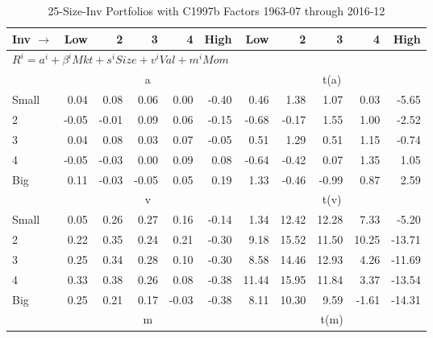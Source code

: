 
\begin{table}[!ht]
\centering
\caption{25-Size-Inv Portfolios with C1997b Factors 1963-07 through 2016-12}
\begin{tabular}{lrrrrrrrrrr}
  \toprule
    Inv $\rightarrow$ & Low & 2 & 3 & 4 & High & Low & 2 & 3 & 4 & High \\ 
  \midrule
  \multicolumn{11}{l}{$R^i=a^i+\beta^iMkt+s^iSize+v^iVal+m^iMom$} \\

  
    
      & \multicolumn{5}{c}{a} & \multicolumn{5}{c}{t(a)}
    
    \\
      \cmidrule(r){2-6} \cmidrule(r){7-11}

    Small   & 0.04  & 0.08  & 0.06  & 0.00  & -0.40  & 0.46  & 1.38  & 1.07  & 0.03  & -5.65  \\
         2  & -0.05  & -0.01  & 0.09  & 0.06  & -0.15  & -0.68  & -0.17  & 1.55  & 1.00  & -2.52  \\
         3  & 0.04  & 0.08  & 0.03  & 0.07  & -0.05  & 0.51  & 1.29  & 0.51  & 1.15  & -0.74  \\
         4  & -0.05  & -0.03  & 0.00  & 0.09  & 0.08  & -0.64  & -0.42  & 0.07  & 1.35  & 1.05  \\
    Big     & 0.11  & -0.03  & -0.05  & 0.05  & 0.19  & 1.33  & -0.46  & -0.99  & 0.87  & 2.59  \\

  
    
      & \multicolumn{5}{c}{v} & \multicolumn{5}{c}{t(v)}
    
    \\
      \cmidrule(r){2-6} \cmidrule(r){7-11}

    Small   & 0.05  & 0.26  & 0.27  & 0.16  & -0.14  & 1.34  & 12.42  & 12.28  & 7.33  & -5.20  \\
         2  & 0.22  & 0.35  & 0.24  & 0.21  & -0.30  & 9.18  & 15.52  & 11.50  & 10.25  & -13.71  \\
         3  & 0.25  & 0.34  & 0.28  & 0.10  & -0.30  & 8.58  & 14.46  & 12.93  & 4.26  & -11.69  \\
         4  & 0.33  & 0.38  & 0.26  & 0.08  & -0.38  & 11.44  & 15.95  & 11.84  & 3.37  & -13.54  \\
    Big     & 0.25  & 0.21  & 0.17  & -0.03  & -0.38  & 8.11  & 10.30  & 9.59  & -1.61  & -14.31  \\

  
    
      & \multicolumn{5}{c}{m} & \multicolumn{5}{c}{t(m)}
    

\end{tabular}
\end{table}

